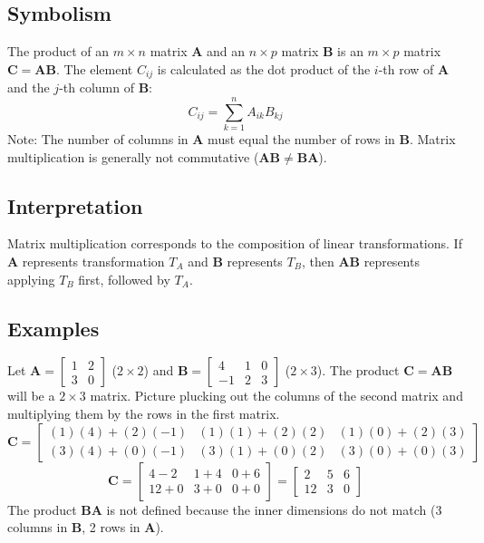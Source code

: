 \documentclass{article}
\newcommand{\mat}[1]{\bm{#1}}  %
\begin{document}
\subsection*{Symbolism}
The product of an $m \times n$ matrix $\mat{A}$ and an $n \times p$ matrix $\mat{B}$ is an $m \times p$ matrix $\mat{C} = \mat{A}\mat{B}$. The element $C_{ij}$ is calculated as the dot product of the $i$-th row of $\mat{A}$ and the $j$-th column of $\mat{B}$:
\[ C_{ij} = \sum_{k=1}^{n} A_{ik} B_{kj} \]
Note: The number of columns in $\mat{A}$ must equal the number of rows in $\mat{B}$. Matrix multiplication is generally not commutative ($\mat{A}\mat{B} \neq \mat{B}\mat{A}$).

\subsection*{Interpretation}
Matrix multiplication corresponds to the composition of linear transformations. If $\mat{A}$ represents transformation $T_A$ and $\mat{B}$ represents $T_B$, then $\mat{A}\mat{B}$ represents applying $T_B$ first, followed by $T_A$.

\subsection*{Examples}
Let $\mat{A} = \begin{bmatrix} 1 & 2 \\ 3 & 0 \end{bmatrix}$ ($2 \times 2$) and $\mat{B} = \begin{bmatrix} 4 & 1 & 0 \\ -1 & 2 & 3 \end{bmatrix}$ ($2 \times 3$). The product $\mat{C} = \mat{A}\mat{B}$ will be a $2 \times 3$ matrix. Picture plucking out the columns of the second matrix and multiplying them by the rows in the first matrix.
\[ \mat{C} = \begin{bmatrix} (1)(4)+(2)(-1) & (1)(1)+(2)(2) & (1)(0)+(2)(3) \\ (3)(4)+(0)(-1) & (3)(1)+(0)(2) & (3)(0)+(0)(3) \end{bmatrix} \]
\[ \mat{C} = \begin{bmatrix} 4-2 & 1+4 & 0+6 \\ 12+0 & 3+0 & 0+0 \end{bmatrix} = \begin{bmatrix} 2 & 5 & 6 \\ 12 & 3 & 0 \end{bmatrix} \]
The product $\mat{B}\mat{A}$ is not defined because the inner dimensions do not match (3 columns in $\mat{B}$, 2 rows in $\mat{A}$).
\end{document}

